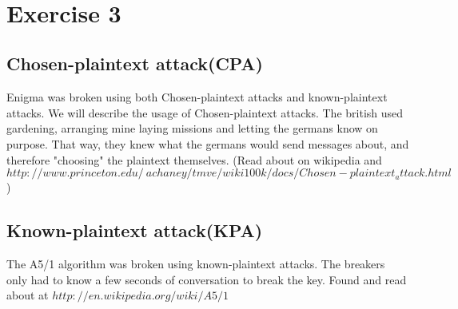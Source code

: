 \documentclass[a4paper,12pt]{article}
\title{
\HRule \\
\textsc{\doctitle} \\
	 \small{\textsl{\docsubtitle}}
\HRule
}
\author{\docauthor\\\small{\docplace}}
\date{\docdate}
\begin{document}
\section*{Exercise 3}
\subsection*{Chosen-plaintext attack(CPA)}
Enigma was broken using both Chosen-plaintext attacks and known-plaintext attacks. We will describe the usage of Chosen-plaintext attacks. The british used gardening, arranging mine laying missions and letting the germans know on purpose. That way, they knew what the germans would send messages about, and therefore "choosing" the plaintext themselves. (Read about on wikipedia and $http://www.princeton.edu/~achaney/tmve/wiki100k/docs/Chosen-plaintext_attack.html$)
\subsection*{Known-plaintext attack(KPA)}
The A5/1 algorithm was broken using known-plaintext attacks. The breakers only had to know a few seconds of conversation to break the key.	 Found and read about at $http://en.wikipedia.org/wiki/A5/1$
\newpage
\end{document}
